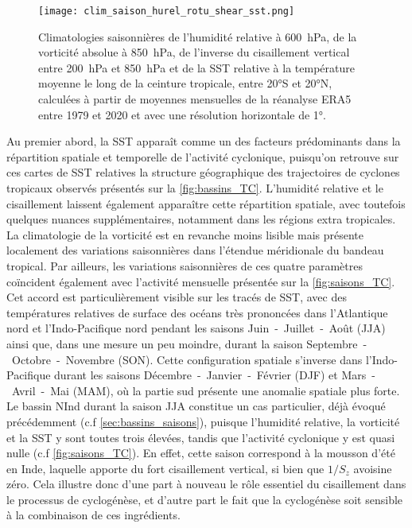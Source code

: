 \documentclass[../main.tex]{subfiles}
\begin{document}
\begin{figure}[tp]
    \centering
    \texttt{[image: clim\_saison\_hurel\_rotu\_shear\_sst.png]}
    \caption{Climatologies saisonnières de l'humidité relative à \SI{600}{\hecto\pascal}, de la vorticité absolue à \SI{850}{\hecto\pascal}, de l'inverse du cisaillement vertical entre \SI{200}{\hecto\pascal} et \SI{850}{\hecto\pascal} et de la SST relative à la température moyenne le long de la ceinture tropicale, entre \ang{20}S et \ang{20}N, calculées à partir de moyennes mensuelles de la réanalyse ERA5 entre 1979 et 2020 et avec une résolution horizontale de \ang{1}.}
    \label{fig:clim_ingredients}
\end{figure}

Au premier abord, la SST apparaît comme un des facteurs prédominants dans la répartition spatiale et temporelle de l'activité cyclonique, puisqu'on retrouve sur ces cartes de SST relatives la structure géographique des trajectoires de cyclones tropicaux observés présentés sur la \cref{fig:bassins_TC}. L'humidité relative et le cisaillement laissent également apparaître cette répartition spatiale, avec toutefois quelques nuances supplémentaires, notamment dans les régions extra
tropicales. La climatologie de la vorticité est en revanche moins lisible mais présente localement des variations saisonnières dans l'étendue méridionale du bandeau tropical. Par ailleurs, les variations saisonnières de ces quatre paramètres coïncident également avec l'activité mensuelle présentée sur la \cref{fig:saisons_TC}. Cet accord est particulièrement visible sur les tracés de SST, avec des températures relatives de surface des océans très
prononcées dans l'Atlantique nord et l'Indo-Pacifique nord pendant les saisons Juin~-~Juillet~-~Août (JJA) ainsi que, dans une mesure un peu moindre, durant la saison Septembre~-~Octobre~-~Novembre (SON). Cette configuration spatiale s'inverse dans l'Indo-Pacifique durant les saisons Décembre~-~Janvier~-~Février (DJF) et Mars~-~Avril~-~Mai (MAM), où la partie sud présente une anomalie spatiale plus forte. Le bassin NInd durant la saison JJA constitue un cas particulier, déjà évoqué
précédemment (c.f \cref{sec:bassins_saisons}), puisque l'humidité relative, la vorticité et la SST y sont toutes trois élevées, tandis que l'activité cyclonique y est quasi nulle (c.f \cref{fig:saisons_TC}). En effet, cette saison correspond à la mousson d'été en Inde, laquelle apporte du fort cisaillement vertical, si bien que $1/S_z$ avoisine zéro. Cela illustre donc d'une part à nouveau le rôle essentiel du cisaillement dans le processus de cyclogénèse, et d'autre part le fait que la cyclogénèse soit sensible à la
combinaison de ces ingrédients.
\end{document}
